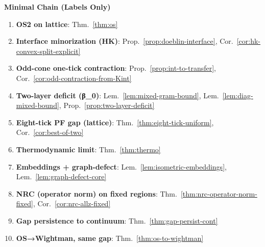 \documentclass[11pt]{amsart}
\theoremstyle{plain}
\theoremstyle{definition}
\theoremstyle{remark}
\begin{document}
\begin{mdframed}[linewidth=0.8pt, linecolor=black!30, backgroundcolor=yellow!4, roundcorner=3pt, innertopmargin=8pt, innerbottommargin=8pt, skipabove=10pt, skipbelow=10pt]
\textbf{Minimal Chain (Labels Only)}
\begin{enumerate}[leftmargin=2em, itemsep=3pt]
  \item \textbf{OS2 on lattice}: Thm.~\ref{thm:os}
  \item \textbf{Interface minorization (HK)}: Prop.~\ref{prop:doeblin-interface}, Cor.~\ref{cor:hk-convex-split-explicit}
  \item \textbf{Odd-cone one-tick contraction}: Prop.~\ref{prop:int-to-transfer}, Cor.~\ref{cor:odd-contraction-from-Kint}
  \item \textbf{Two-layer deficit (β\_0)}: Lem.~\ref{lem:mixed-gram-bound}, Lem.~\ref{lem:diag-mixed-bound}, Prop.~\ref{prop:two-layer-deficit}
  \item \textbf{Eight-tick PF gap (lattice)}: Thm.~\ref{thm:eight-tick-uniform}, Cor.~\ref{cor:best-of-two}
  \item \textbf{Thermodynamic limit}: Thm.~\ref{thm:thermo}
  \item \textbf{Embeddings + graph-defect}: Lem.~\ref{lem:isometric-embeddings}, Lem.~\ref{lem:graph-defect-core}
  \item \textbf{NRC (operator norm) on fixed regions}: Thm.~\ref{thm:nrc-operator-norm-fixed}, Cor.~\ref{cor:nrc-allz-fixed}
  \item \textbf{Gap persistence to continuum}: Thm.~\ref{thm:gap-persist-cont}
  \item \textbf{OS→Wightman, same gap}: Thm.~\ref{thm:os-to-wightman}
\end{enumerate}
\end{mdframed}
\end{document}
